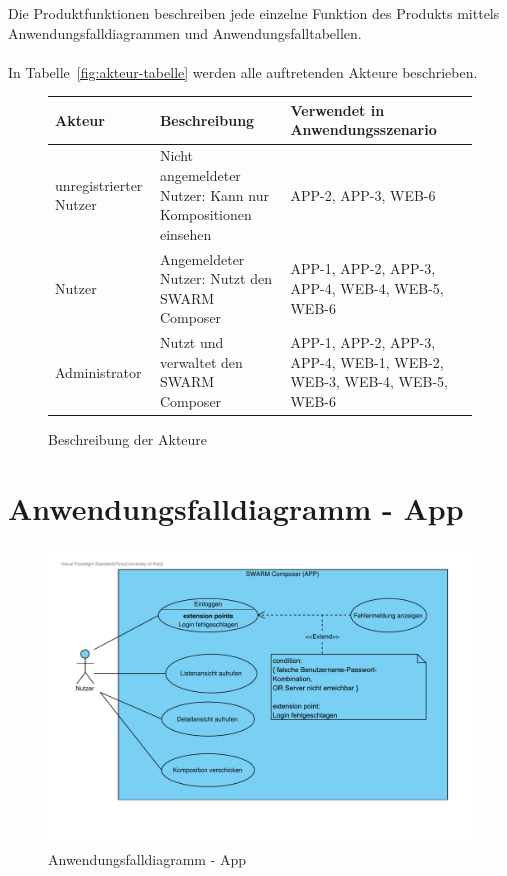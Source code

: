 Die Produktfunktionen beschreiben jede einzelne Funktion des Produkts mittels Anwendungsfalldiagrammen und Anwendungsfalltabellen.
\\\\
In  Tabelle~\autoref{fig:akteur-tabelle} werden alle auftretenden Akteure beschrieben.


\begin{figure}[h]
	\centering

	\begin{tabularx}{\textwidth}{ p{} | p{} | X }
		\textbf{Akteur} & \textbf{Beschreibung} & \textbf{Verwendet in Anwendungsszenario} \\ \hline
		unregistrierter Nutzer & Nicht angemeldeter Nutzer: Kann nur Kompositionen einsehen & APP-2, APP-3, WEB-6
		\\ \hline Nutzer & Angemeldeter Nutzer: Nutzt den SWARM Composer & APP-1, APP-2, APP-3, APP-4, WEB-4, WEB-5, WEB-6
		\\ \hline Administrator & Nutzt und verwaltet den SWARM Composer & APP-1, APP-2, APP-3, APP-4, WEB-1, WEB-2, WEB-3, WEB-4, WEB-5, WEB-6
	\end{tabularx}

	\caption{Beschreibung der Akteure}
	\label{fig:akteur-tabelle}
\end{figure}


\newpage

\section{Anwendungsfalldiagramm - App}

\begin{figure}[h]
	\centering	
	\includegraphics[width=\textwidth]{img/Produktfunktionen_app}	
	\caption{Anwendungsfalldiagramm - App}
	\label{fig:anwendungsfalldiagramm-app}
\end{figure}

